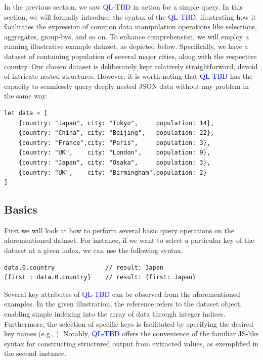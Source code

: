 \documentclass[runningheads]{llncs}
\newcommand{\lang}{\textcolor{blue}{QL-TBD}}
\begin{document}
In the previous section, we saw \lang{} in action for a simple query.
In this section, we will formally introduce the syntax of the \lang{}, illustrating how it facilitates
the expression of common data manipulation operations like selections, aggregates,
group-bys, and so on.
To enhance comprehension, we will employ a running illustrative example dataset, as
depicted below.
Specifically, we have a dataset of containing population of several major cities,
along with the respective country.
Our chosen dataset is deliberately kept relatively straightforward, devoid of
intricate nested structures.
However, it is worth noting that \lang{} has the capacity to seamlessly query
deeply nested JSON data without any problem in the same way.


\begin{lstlisting}[style=JavaScript]
let data = [
    {country: "Japan", city: "Tokyo",     population: 14},
    {country: "China", city: "Beijing",   population: 22},
    {country: "France",city: "Paris",     population: 3},
    {country: "UK",    city: "London",    population: 9},
    {country: "Japan", city: "Osaka",     population: 3},
    {country: "UK",    city: "Birmingham",population: 2}
]
\end{lstlisting}


\subsection{Basics}
First we will look at how to perform several basic query operations on the
aforementioned dataset.
For instance, if we want to select a particular key of the dataset at a given
index, we can use the following syntax.

\begin{lstlisting}[style=JavaScript]
data.0.country              // result: Japan
{first : data.0.country}    // result: {first: Japan}
\end{lstlisting}

Several key attributes of \lang{} can be observed from the aforementioned examples.
In the given illustration, the reference  refers to
the dataset object, enabling simple indexing into the array of data through integer
indices.
Furthermore, the selection of specific keys is facilitated by specifying the desired
key names (e.g., ).
Notably, \lang{} offers the convenience of the familiar JS-like syntax for constructing
structured output from extracted values, as exemplified in the second instance.
\end{document}
